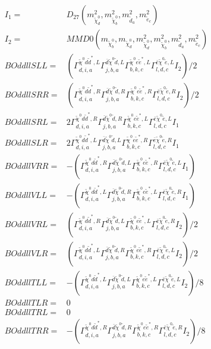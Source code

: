 \documentclass[A4,landscape]{article}
\begin{document}
\begin{align} 
I_1 = & D_{27}(m^2_{\tilde{\chi}^0_{{d}}}, m^2_{\tilde{\chi}^0_{{b}}}, m^2_{\tilde{d}_{{a}}}, m^2_{\tilde{e}_{{c}}}) \\ 
I_2 = & MMD0(m_{\tilde{\chi}^0_{{b}}}, m_{\tilde{\chi}^0_{{d}}}, m^2_{\tilde{\chi}^0_{{d}}}, m^2_{\tilde{\chi}^0_{{b}}}, m^2_{\tilde{d}_{{a}}}, m^2_{\tilde{e}_{{c}}}) \\ 
  BOddllSLL= & ( \Gamma^{\tilde{\chi}^0 d \tilde{d}^*,L}_{d, i, a} \Gamma^{\bar{d}\tilde{\chi}^0 \tilde{d} ,L}_{j, b, a} \Gamma^{\tilde{\chi}^0 e \tilde{e}^*,L}_{b, k, c} \Gamma^{\bar{e}\tilde{\chi}^0 \tilde{e} ,L}_{l, d, c} I_2)/2 \\ 
  BOddllSRR= & ( \Gamma^{\tilde{\chi}^0 d \tilde{d}^*,R}_{d, i, a} \Gamma^{\bar{d}\tilde{\chi}^0 \tilde{d} ,R}_{j, b, a} \Gamma^{\tilde{\chi}^0 e \tilde{e}^*,R}_{b, k, c} \Gamma^{\bar{e}\tilde{\chi}^0 \tilde{e} ,R}_{l, d, c} I_2)/2 \\ 
  BOddllSRL= & 2  \Gamma^{\tilde{\chi}^0 d \tilde{d}^*,R}_{d, i, a} \Gamma^{\bar{d}\tilde{\chi}^0 \tilde{d} ,R}_{j, b, a} \Gamma^{\tilde{\chi}^0 e \tilde{e}^*,L}_{b, k, c} \Gamma^{\bar{e}\tilde{\chi}^0 \tilde{e} ,L}_{l, d, c} I_1 \\ 
  BOddllSLR= & 2  \Gamma^{\tilde{\chi}^0 d \tilde{d}^*,L}_{d, i, a} \Gamma^{\bar{d}\tilde{\chi}^0 \tilde{d} ,L}_{j, b, a} \Gamma^{\tilde{\chi}^0 e \tilde{e}^*,R}_{b, k, c} \Gamma^{\bar{e}\tilde{\chi}^0 \tilde{e} ,R}_{l, d, c} I_1 \\ 
  BOddllVRR= & -( \Gamma^{\tilde{\chi}^0 d \tilde{d}^*,R}_{d, i, a} \Gamma^{\bar{d}\tilde{\chi}^0 \tilde{d} ,L}_{j, b, a} \Gamma^{\tilde{\chi}^0 e \tilde{e}^*,R}_{b, k, c} \Gamma^{\bar{e}\tilde{\chi}^0 \tilde{e} ,L}_{l, d, c} I_1) \\ 
  BOddllVLL= & -( \Gamma^{\tilde{\chi}^0 d \tilde{d}^*,L}_{d, i, a} \Gamma^{\bar{d}\tilde{\chi}^0 \tilde{d} ,R}_{j, b, a} \Gamma^{\tilde{\chi}^0 e \tilde{e}^*,L}_{b, k, c} \Gamma^{\bar{e}\tilde{\chi}^0 \tilde{e} ,R}_{l, d, c} I_1) \\ 
  BOddllVRL= & ( \Gamma^{\tilde{\chi}^0 d \tilde{d}^*,R}_{d, i, a} \Gamma^{\bar{d}\tilde{\chi}^0 \tilde{d} ,L}_{j, b, a} \Gamma^{\tilde{\chi}^0 e \tilde{e}^*,L}_{b, k, c} \Gamma^{\bar{e}\tilde{\chi}^0 \tilde{e} ,R}_{l, d, c} I_2)/2 \\ 
  BOddllVLR= & ( \Gamma^{\tilde{\chi}^0 d \tilde{d}^*,L}_{d, i, a} \Gamma^{\bar{d}\tilde{\chi}^0 \tilde{d} ,R}_{j, b, a} \Gamma^{\tilde{\chi}^0 e \tilde{e}^*,R}_{b, k, c} \Gamma^{\bar{e}\tilde{\chi}^0 \tilde{e} ,L}_{l, d, c} I_2)/2 \\ 
  BOddllTLL= & -( \Gamma^{\tilde{\chi}^0 d \tilde{d}^*,L}_{d, i, a} \Gamma^{\bar{d}\tilde{\chi}^0 \tilde{d} ,L}_{j, b, a} \Gamma^{\tilde{\chi}^0 e \tilde{e}^*,L}_{b, k, c} \Gamma^{\bar{e}\tilde{\chi}^0 \tilde{e} ,L}_{l, d, c} I_2)/8 \\ 
  BOddllTLR= & 0 \\ 
  BOddllTRL= & 0 \\ 
  BOddllTRR= & -( \Gamma^{\tilde{\chi}^0 d \tilde{d}^*,R}_{d, i, a} \Gamma^{\bar{d}\tilde{\chi}^0 \tilde{d} ,R}_{j, b, a} \Gamma^{\tilde{\chi}^0 e \tilde{e}^*,R}_{b, k, c} \Gamma^{\bar{e}\tilde{\chi}^0 \tilde{e} ,R}_{l, d, c} I_2)/8 \\ 
\end{align} 
\end{document}
